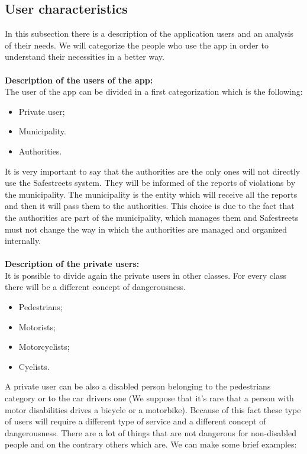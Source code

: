 \documentclass[titlepage]{article}
\begin{document}
\subsection{User characteristics}
In this subsection there is a description of the application users and an analysis of their needs. We will categorize the people who use the app in order to understand their necessities in a better way.\\
\textbf{\\Description of the users of the app:\\}
The user of the app can be divided in a first categorization which is the following:
\begin{itemize}
	\item Private user;
	\item Municipality.
	\item Authorities.\\
\end{itemize}
It is very important to say that the authorities are the only ones will not directly use the Safestreets system. They will be informed of the reports of violations by the municipality. The municipality is the entity which will receive all the reports and then it will pass them to the authorities. This choice is due to the fact that the authorities are part of the municipality, which manages them and Safestreets must not change the way in which the authorities are managed and organized internally. \\ \\
\textbf{Description of the private users: }\\ 
It is possible to divide again the private users in other classes. For every class there will be a different concept of dangerousness.
\begin{itemize}
	\item Pedestrians;
	\item Motorists;
	\item Motorcyclists;
	\item Cyclists.
\end{itemize}
A private user can be also a disabled person belonging to the pedestrians category or to the car drivers one (We suppose that it's rare that a person with motor disabilities drives a bicycle or a motorbike). Because of this fact these type of users will require a different type of service and a different concept of dangerousness. There are a lot of things that are not dangerous for non-disabled people and on the contrary others which are. We can make some brief examples: \\ \\
\end{document}
